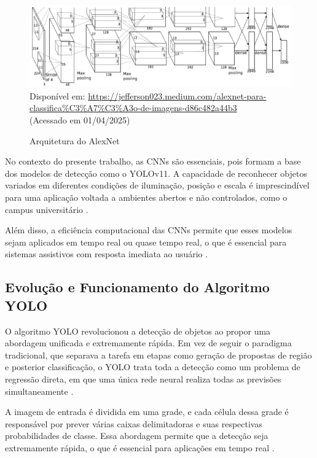 \begin{figure}[htbp]
  \centering
  \caption{Arquitetura do AlexNet}
  \includegraphics[width=1.0\textwidth]{Figuras/arquitetura-alexnet.png}
  \\
  Disponível em: \url{https://jefferson023.medium.com/alexnet-para-classifica%C3%A7%C3%A3o-de-imagens-d86c482a44b3} \\(Acessado em 01/04/2025)
  \label{fg1}
\end{figure}

No contexto do presente trabalho, as CNNs são essenciais, pois formam a base dos modelos de detecção como o YOLOv11. A capacidade de reconhecer objetos variados em diferentes condições de iluminação, posição e escala é imprescindível para uma aplicação voltada a ambientes abertos e não controlados, como o campus universitário \cite{redmon2016}.

Além disso, a eficiência computacional das CNNs permite que esses modelos sejam aplicados em tempo real ou quase tempo real, o que é essencial para sistemas assistivos com resposta imediata ao usuário \cite{bochkovskiy2020}.

\subsection{Evolução e Funcionamento do Algoritmo YOLO}

O algoritmo YOLO revolucionou a detecção de objetos ao propor uma abordagem unificada e extremamente rápida. Em vez de seguir o paradigma tradicional, que separava a tarefa em etapas como geração de propostas de região e posterior classificação, o YOLO trata toda a detecção como um problema de regressão direta, em que uma única rede neural realiza todas as previsões simultaneamente \cite{redmon2016}.

A imagem de entrada é dividida em uma grade, e cada célula dessa grade é responsável por prever várias caixas delimitadoras e suas respectivas probabilidades de classe. Essa abordagem permite que a detecção seja extremamente rápida, o que é essencial para aplicações em tempo real \cite{bochkovskiy2020}.

